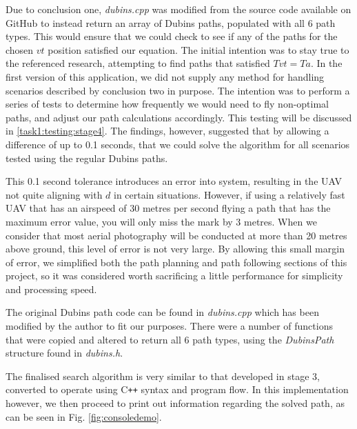 Due to conclusion one, \textit{dubins.cpp} was modified from the source code available on GitHub to instead return an array of Dubins paths, populated with all 6 path types. This would ensure that we could check to see if any of the paths for the chosen $vt$ position satisfied our equation. The initial intention was to stay true to the referenced research, attempting to find paths that satisfied $Tvt = Ta$. In the first version of this application, we did not supply any method for handling scenarios described by conclusion two in purpose. The intention was to perform a series of tests to determine how frequently we would need to fly non-optimal paths, and adjust our path calculations accordingly. This testing will be discussed in \ref{task1:testing:stage4}. The findings, however, suggested that by allowing a difference of up to 0.1 seconds, that we could solve the algorithm for all scenarios tested using the regular Dubins paths. 

This 0.1 second tolerance introduces an error into system, resulting in the UAV not quite aligning with $d$ in certain situations. However, if using a relatively fast UAV that has an airspeed of 30 metres per second flying a path that has the maximum error value, you will only miss the mark by 3 metres. When we consider that most aerial photography will be conducted at more than 20 metres above ground, this level of error is not very large. By allowing this small margin of error, we simplified both the path planning and path following sections of this project, so it was considered worth sacrificing a little performance for simplicity and processing speed.


The original Dubins path code can be found in \textit{dubins.cpp} which has been modified by the author to fit our purposes. There were a number of functions that were copied and altered to return all 6 path types, using the \textit{DubinsPath} structure found in \textit{dubins.h}. 

The finalised search algorithm is very similar to that developed in stage 3, converted to operate using C\texttt{++} syntax and program flow. In this implementation however, we then proceed to print out information regarding the solved path, as can be seen in Fig. \ref{fig:consoledemo}.

